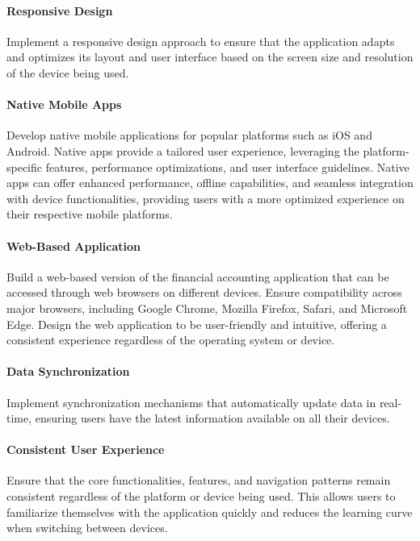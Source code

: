 \paragraph{Responsive Design}
Implement a responsive design approach to ensure that the application adapts and optimizes its layout and user 
interface based on the screen size and resolution of the device being used.

\paragraph{Native Mobile Apps}
Develop native mobile applications for popular platforms such as iOS and Android. Native apps provide a tailored 
user experience, leveraging the platform-specific features, performance optimizations, and user interface guidelines. 
Native apps can offer enhanced performance, offline capabilities, and seamless integration with device functionalities, 
providing users with a more optimized experience on their respective mobile platforms.

\paragraph{Web-Based Application}
Build a web-based version of the financial accounting application that can be accessed through web browsers on 
different devices. Ensure compatibility across major browsers, including Google Chrome, Mozilla Firefox, Safari, 
and Microsoft Edge. Design the web application to be user-friendly and intuitive, offering a consistent experience 
regardless of the operating system or device.

\paragraph{Data Synchronization}
Implement synchronization mechanisms that automatically update data in real-time, ensuring users have the latest 
information available on all their devices.

\paragraph{Consistent User Experience}
Ensure that the core functionalities, features, and navigation patterns remain consistent regardless of the platform or 
device being used. This allows users to familiarize themselves with the application quickly and reduces the learning 
curve when switching between devices.


